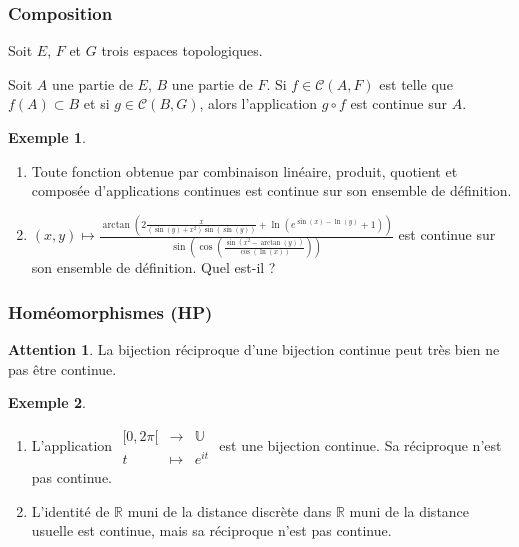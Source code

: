 \documentclass[french]{article}
\newcommand{\R}{\mathbb{R}}
\newcommand{\U}{\mathbb{U}}
\theoremstyle{plain}
\theoremstyle{definition}
\newtheorem*{ex}{Exemple}
\newtheorem*{attention}{Attention}
\theoremstyle{remark}
\begin{document}
\subsubsection*{Composition}

Soit $E$, $F$ et $G$ trois espaces topologiques.

\begin{prop}%
	Soit $A$ une partie de $E$, $B$ une partie de $F$. Si $f\in\mathcal{C}(A,F)$ est telle que $f(A)\subset B$ et si $g\in\mathcal{C}(B,G)$, alors l'application $g\circ f$ est continue sur $A$.
\end{prop}

\begin{ex}
	\begin{enumerate}
		\item Toute fonction obtenue par combinaison linéaire, produit, quotient et composée d'applications continues est continue sur son ensemble de définition.
		\item $\displaystyle (x,y)\mapsto\frac{\arctan\left(2\frac{x}{(\sin(y)+x^2)\sin(\sin(y))}+\ln(e^{\sin(x)-\ln(y)}+1)\right)}{\sin\left(\cos\left(\frac{\sin(x^2-\arctan(y))}{\cos(\ln(x))}\right)\right)}$ est continue sur son ensemble de définition. Quel est-il ?
	\end{enumerate}
\end{ex}

\subsubsection*{Homéomorphismes (HP)}

\begin{attention}
	La bijection réciproque d'une bijection continue peut très bien ne pas être continue.
\end{attention}

\begin{ex}
	\begin{enumerate}
		\item L'application $\begin{array}{rcl}
			[0,2\pi[&\longrightarrow&\U\\
			t&\longmapsto&e^{it}
		\end{array}$ est une bijection continue. Sa réciproque n'est pas continue.
		\item L'identité de $\R$ muni de la distance discrète dans $\R$ muni de la distance usuelle est continue, mais sa réciproque n'est pas continue.
	\end{enumerate}
\end{ex}
\end{document}
